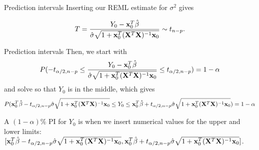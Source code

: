 \documentclass[
  ignorenonframetext,
]{beamer}
\begin{document}
\begin{frame}{Prediction intervals}
\label{prediction-intervals-2}
Inserting our REML estimate for \(\sigma^2\) gives

\[T=\frac{Y_0-{\bf x}_0^T \hat{\beta}}{\hat{\sigma}\sqrt{1+{\bf x}_0^T({\bf X}^T{\bf X})^{-1}{\bf x}_0}}\sim t_{n-p}.\]
\end{frame}

\begin{frame}{Prediction intervals}
\label{prediction-intervals-3}
Then, we start with
\[ P(-t_{\alpha/2,n-p}\le \frac{Y_0-{\bf x}_0^T \hat{\beta}}{\hat{\sigma}\sqrt{1+{\bf x}_0^T({\bf X}^T{\bf X})^{-1}{\bf x}_0}} \le t_{\alpha/2,n-p})=1-\alpha\]
and solve so that \(Y_0\) is in the middle, which gives
\[P({\bf x}_0^T \hat{\beta}-t_{\alpha/2,n-p}\hat{\sigma}\sqrt{1+{\bf x}_0^T({\bf X}^T{\bf X})^{-1}{\bf x}_0} \le Y_0 \le {\bf x}_0^T \hat{\beta}+t_{\alpha/2,n-p}\hat{\sigma}\sqrt{1+{\bf x}_0^T({\bf X}^T{\bf X})^{-1}{\bf x}_0})=1-\alpha\]

A \((1-\alpha)\)\% PI for \(Y_0\) is when we insert numerical values for
the upper and lower limits:
\([{\bf x}_0^T \hat{\beta}-t_{\alpha/2,n-p}\hat{\sigma}\sqrt{1+{\bf x}_0^T({\bf X}^T{\bf X})^{-1}{\bf x}_0}, {\bf x}_0^T \hat{\beta}+t_{\alpha/2,n-p}\hat{\sigma}\sqrt{1+{\bf x}_0^T({\bf X}^T{\bf X})^{-1}{\bf x}_0}]\).
\end{frame}
\end{document}
